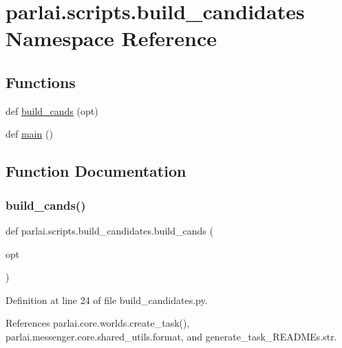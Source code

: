 \hypertarget{namespaceparlai_1_1scripts_1_1build__candidates}{}\section{parlai.\+scripts.\+build\+\_\+candidates Namespace Reference}
\label{namespaceparlai_1_1scripts_1_1build__candidates}
\subsection*{Functions}
\begin{DoxyCompactItemize}
\item 
def \hyperlink{namespaceparlai_1_1scripts_1_1build__candidates_a7932b774b6e77c36347f89f3d79c676e}{build\+\_\+cands} (opt)
\item 
def \hyperlink{namespaceparlai_1_1scripts_1_1build__candidates_a99ffd6743adcd4a6f0f5a26418d21a3a}{main} ()
\end{DoxyCompactItemize}


\subsection{Function Documentation}
\mbox{\label{namespaceparlai_1_1scripts_1_1build__candidates_a7932b774b6e77c36347f89f3d79c676e}} 
\subsubsection{\texorpdfstring{build\+\_\+cands()}{build\_cands()}}
{\footnotesize\ttfamily def parlai.\+scripts.\+build\+\_\+candidates.\+build\+\_\+cands (\begin{DoxyParamCaption}\item[{}]{opt }\end{DoxyParamCaption})}



Definition at line 24 of file build\+\_\+candidates.\+py.



References parlai.\+core.\+worlds.\+create\+\_\+task(), parlai.\+messenger.\+core.\+shared\+\_\+utils.\+format, and generate\+\_\+task\+\_\+\+R\+E\+A\+D\+M\+Es.\+str.



